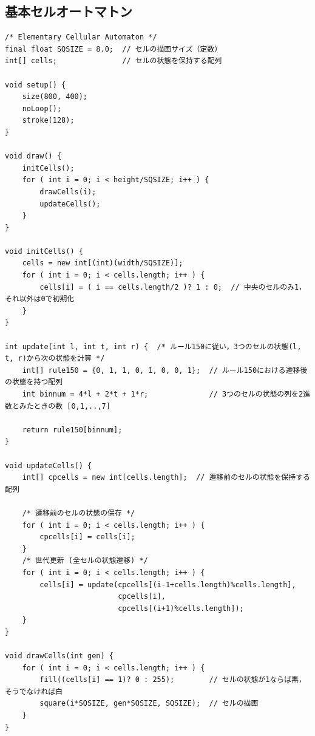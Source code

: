 \documentclass[dvipdfmx]{jsarticle}
\theoremstyle{definition}
\begin{document}
\subsection{基本セルオートマトン}  \label{subsec_code_ECA}
\begin{lstlisting}[caption=基本セルオートマトン（ルール150）, label=code_ECA_all]
/* Elementary Cellular Automaton */
final float SQSIZE = 8.0;  // セルの描画サイズ（定数）
int[] cells;               // セルの状態を保持する配列

void setup() {
    size(800, 400);
    noLoop();
    stroke(128);
}

void draw() {
    initCells();
    for ( int i = 0; i < height/SQSIZE; i++ ) {
        drawCells(i);
        updateCells();
    }
}

void initCells() {
    cells = new int[(int)(width/SQSIZE)];
    for ( int i = 0; i < cells.length; i++ ) {
        cells[i] = ( i == cells.length/2 )? 1 : 0;  // 中央のセルのみ1，それ以外は0で初期化
    }
}

int update(int l, int t, int r) {  /* ルール150に従い，3つのセルの状態(l, t, r)から次の状態を計算 */
    int[] rule150 = {0, 1, 1, 0, 1, 0, 0, 1};  // ルール150における遷移後の状態を持つ配列
    int binnum = 4*l + 2*t + 1*r;              // 3つのセルの状態の列を2進数とみたときの数 [0,1,..,7]

    return rule150[binnum];
}

void updateCells() {
    int[] cpcells = new int[cells.length];  // 遷移前のセルの状態を保持する配列

    /* 遷移前のセルの状態の保存 */
    for ( int i = 0; i < cells.length; i++ ) {
        cpcells[i] = cells[i];
    }
    /* 世代更新 (全セルの状態遷移) */
    for ( int i = 0; i < cells.length; i++ ) {
        cells[i] = update(cpcells[(i-1+cells.length)%cells.length],
                          cpcells[i],
                          cpcells[(i+1)%cells.length]);
    }
}

void drawCells(int gen) {
    for ( int i = 0; i < cells.length; i++ ) {
        fill((cells[i] == 1)? 0 : 255);        // セルの状態が1ならば黒，そうでなければ白
        square(i*SQSIZE, gen*SQSIZE, SQSIZE);  // セルの描画
    }
}
\end{lstlisting}
\clearpage


\end{document}
